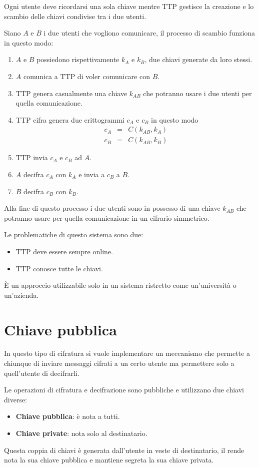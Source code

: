 Ogni utente deve ricordarsi una sola chiave mentre TTP gestisce la creazione e lo scambio delle chiavi condivise tra i
due utenti.

Siano $A$ e $B$ i due utenti che vogliono comunicare, il processo di scambio funziona in questo modo:
\begin{enumerate}
	\item $A$ e $B$ possiedono rispettivamente $k_A$ e $k_B$, due chiavi generate da loro stessi.
	\item $A$ comunica a TTP di voler comunicare con $B$.
	\item TTP genera casualmente una chiave $k_{AB}$ che potranno usare i due utenti per quella comunicazione.
	\item TTP cifra genera due crittogrammi $c_A$ e $c_B$ in questo modo
	      \[
		      \begin{matrix}
			      c_A & = & C(k_{AB}, k_A) \\
			      c_B & = & C(k_{AB}, k_B)
		      \end{matrix}
	      \]
	\item TTP invia $c_A$ e $c_B$ ad $A$.
	\item $A$ decifra $c_A$ con $k_A$ e invia a $c_B$ a $B$.
	\item $B$ decifra $c_B$ con $k_B$.
\end{enumerate}
Alla fine di questo processo i due utenti sono in possesso di una chiave $k_{AB}$ che potranno usare per quella
comunicazione in un cifrario simmetrico.

Le problematiche di questo sistema sono due:
\begin{itemize}
	\item TTP deve essere sempre online.
	\item TTP conosce tutte le chiavi.
\end{itemize}
\`E un approccio utilizzabile solo in un sistema ristretto come un'universit\`a o un'azienda.

\section{Chiave pubblica}
In questo tipo di cifratura si vuole implementare un meccanismo che permette a chiunque di inviare messaggi cifrati a
un certo utente ma permettere solo a quell'utente di decifrarli.

Le operazioni di cifratura e decifrazione sono pubbliche e utilizzano due chiavi diverse:
\begin{itemize}
	\item \textbf{Chiave pubblica}: \`e nota a tutti.
	\item \textbf{Chiave private}: nota solo al destinatario.
\end{itemize}
Questa coppia di chiavi \`e generata dall'utente in veste di destinatario, il rende nota la sua chiave pubblica e
mantiene segreta la sua chiave privata.

